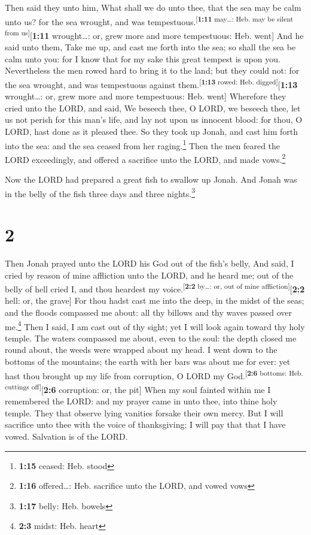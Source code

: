  Then said they unto him, What shall we do unto thee,
that the sea may be calm unto us? for the sea wrought, and was
tempestuous.\textsuperscript{{[}\textbf{1:11} may\ldots: Heb. may be
silent from us{]}}{[}\textbf{1:11} wrought\ldots: or, grew more and more
tempestuous: Heb. went{]}  And he said unto them, Take me
up, and cast me forth into the sea; so shall the sea be calm unto you:
for I know that for my sake this great tempest is upon you.
 Nevertheless the men rowed hard to bring it to the land;
but they could not: for the sea wrought, and was tempestuous against
them.\textsuperscript{{[}\textbf{1:13} rowed: Heb.
digged{]}}{[}\textbf{1:13} wrought\ldots: or, grew more and more
tempestuous: Heb. went{]}  Wherefore they cried unto the
LORD, and said, We beseech thee, O LORD, we beseech thee, let us not
perish for this man's life, and lay not upon us innocent blood: for
thou, O LORD, hast done as it pleased thee.  So they took
up Jonah, and cast him forth into the sea: and the sea ceased from her
raging.\footnote{\textbf{1:15} ceased: Heb. stood}  Then
the men feared the LORD exceedingly, and offered a sacrifice unto the
LORD, and made vows.\footnote{\textbf{1:16} offered\ldots: Heb.
  sacrifice unto the LORD, and vowed vows}

 Now the LORD had prepared a great fish to swallow up
Jonah. And Jonah was in the belly of the fish three days and three
nights.\footnote{\textbf{1:17} belly: Heb. bowels}

\hypertarget{section-1}{%
\section{2}\label{section-1}}

 Then Jonah prayed unto the LORD his God out of the fish's
belly,  And said, I cried by reason of mine affliction
unto the LORD, and he heard me; out of the belly of hell cried I, and
thou heardest my voice.\textsuperscript{{[}\textbf{2:2} by\ldots: or,
out of mine affliction{]}}{[}\textbf{2:2} hell: or, the grave{]}
 For thou hadst cast me into the deep, in the midst of the
seas; and the floods compassed me about: all thy billows and thy waves
passed over me.\footnote{\textbf{2:3} midst: Heb. heart} 
Then I said, I am cast out of thy sight; yet I will look again toward
thy holy temple.  The waters compassed me about, even to
the soul: the depth closed me round about, the weeds were wrapped about
my head.  I went down to the bottoms of the mountains; the
earth with her bars was about me for ever: yet hast thou brought up my
life from corruption, O LORD my God.\textsuperscript{{[}\textbf{2:6}
bottoms: Heb. cuttings off{]}}{[}\textbf{2:6} corruption: or, the pit{]}
 When my soul fainted within me I remembered the LORD: and
my prayer came in unto thee, into thine holy temple.  They
that observe lying vanities forsake their own mercy.  But
I will sacrifice unto thee with the voice of thanksgiving; I will pay
that that I have vowed. Salvation is of the LORD.

